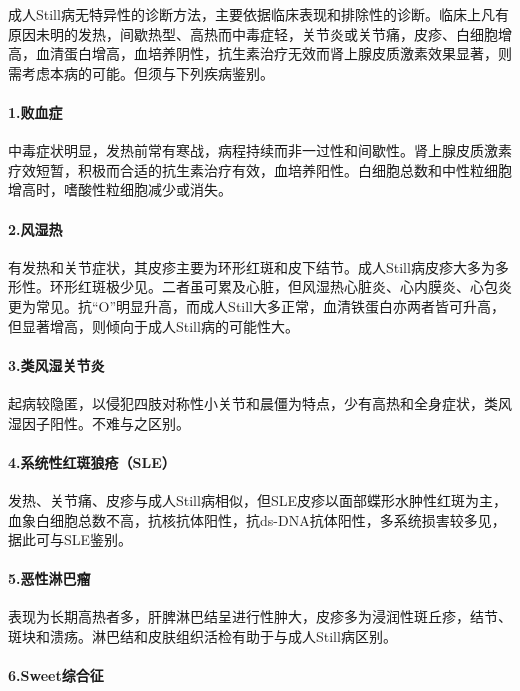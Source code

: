成人Still病无特异性的诊断方法，主要依据临床表现和排除性的诊断。临床上凡有原因未明的发热，间歇热型、高热而中毒症轻，关节炎或关节痛，皮疹、白细胞增高，血清蛋白增高，血培养阴性，抗生素治疗无效而肾上腺皮质激素效果显著，则需考虑本病的可能。但须与下列疾病鉴别。

\paragraph{1.败血症}

中毒症状明显，发热前常有寒战，病程持续而非一过性和间歇性。肾上腺皮质激素疗效短暂，积极而合适的抗生素治疗有效，血培养阳性。白细胞总数和中性粒细胞增高时，嗜酸性粒细胞减少或消失。

\paragraph{2.风湿热}

有发热和关节症状，其皮疹主要为环形红斑和皮下结节。成人Still病皮疹大多为多形性。环形红斑极少见。二者虽可累及心脏，但风湿热心脏炎、心内膜炎、心包炎更为常见。抗“O”明显升高，而成人Still大多正常，血清铁蛋白亦两者皆可升高，但显著增高，则倾向于成人Still病的可能性大。

\paragraph{3.类风湿关节炎}

起病较隐匿，以侵犯四肢对称性小关节和晨僵为特点，少有高热和全身症状，类风湿因子阳性。不难与之区别。

\paragraph{4.系统性红斑狼疮（SLE）}

发热、关节痛、皮疹与成人Still病相似，但SLE皮疹以面部蝶形水肿性红斑为主，血象白细胞总数不高，抗核抗体阳性，抗ds-DNA抗体阳性，多系统损害较多见，据此可与SLE鉴别。

\paragraph{5.恶性淋巴瘤}

表现为长期高热者多，肝脾淋巴结呈进行性肿大，皮疹多为浸润性斑丘疹，结节、斑块和溃疡。淋巴结和皮肤组织活检有助于与成人Still病区别。

\paragraph{6.Sweet综合征}

